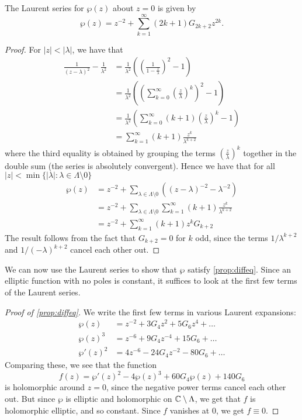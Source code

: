 \begin{proposition}
	\label{prop:laurent}
	The Laurent series for $\wp(z)$ about $z = 0$ is given by
	\begin{equation*}
		\wp(z) = z^{-2} + \sum_{k = 1}^\infty (2k + 1)G_{2k + 2}z^{2k}.
	\end{equation*}
\end{proposition}
\begin{proof}
	For $|z| < |\lambda|$, we have that
	\begin{align*}
		\frac{1}{(z - \lambda)^2} - \frac{1}{\lambda^{2}}
		&= \frac{1}{\lambda^2}\left(\left(\frac{1}{1 - \frac{z}{\lambda}}
			\right)^2 - 1\right)\\
		&= \frac{1}{\lambda^2}\left(\left(
		\sum_{k = 0}^{\infty}\left(\frac{z}{\lambda}\right)^k\right)^2 -
		1 \right)\\	
		&= \frac{1}{\lambda^2}\left(
		\sum_{k = 0}^\infty(k + 1)\left(\frac{z}{\lambda}\right)^k - 1\right)\\
		&= \sum_{k = 1}^\infty (k + 1)\frac{z^k}{\lambda^{k+ 2}}
	\end{align*}
	where the third equality is obtained by grouping the terms
	$\left(\frac{z}{\lambda}\right)^k$ together in the double sum 
	(the series is absolutely convergent). Hence we have that
	for all $|z| < \min\{|\lambda|: \lambda \in \Lambda\setminus 0\}$
	\begin{align*}
		\wp(z) &= z^{-2} + \sum_{\lambda\in \Lambda \setminus 0}
		\left((z - \lambda)^{-2} - \lambda^{-2}\right)\\
		&= z^{-2} + \sum_{\lambda\in \Lambda\setminus 0}
		\sum_{k = 1}^\infty(k + 1)\frac{z^k}{\lambda^{k + 2}}\\
		&= z^{-2} + \sum_{k = 1}^{\infty}(k + 1)z^k G_{k + 2}
	\end{align*}
	The result follows from the fact that $G_{k + 2} = 0$ for $k$ odd, since
	the terms $1/\lambda^{k + 2}$ and $1/(-\lambda)^{k + 2}$ cancel each other
	out.
\end{proof}

We can now use the Laurent series to show that $\wp$ satisfy \ref{prop:diffeq}.
Since an elliptic function with no poles is constant, it suffices to look
at the first few terms of the Laurent series.

\begin{proof}[Proof of \ref{prop:diffeq}]
	We write the first few terms in various Laurent expansions:
	\begin{align*}
		\wp(z) &= z^{-2} + 3G_4z^2 + 5G_6z^4 + \dots\\
		\wp(z)^3 &= z^{-6} + 9G_4z^{-4} + 15G_6 + \dots\\
		\wp'(z)^2 &= 4z^{-6} - 24G_4z^{-2} - 80G_6 + \dots
	\end{align*}
	Comparing these, we see that the function
	\begin{equation*}
		f(z) = \wp'(z)^2 - 4\wp(z)^3 + 60G_4\wp(z) + 140G_6
	\end{equation*}
	is holomorphic around $z = 0$, since the negative power terms cancel
	each other out. But since $\wp$ is elliptic and holomorphic on $\mathbb{C} \setminus
	\Lambda$, we get that $f$ is holomorphic elliptic, and so constant.
	Since $f$ vanishes at $0$, we get $f\equiv 0$.
\end{proof}


